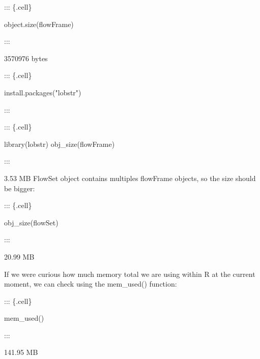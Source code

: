 \documentclass[
  letterpaper,
  DIV=11,
  numbers=noendperiod]{scrartcl}
\newenvironment{Shaded}{\begin{snugshade}}{\end{snugshade}}
\newcommand{\FunctionTok}[1]{\textcolor[rgb]{0.28,0.35,0.67}{#1}}
\newcommand{\NormalTok}[1]{\textcolor[rgb]{0.00,0.23,0.31}{#1}}
\newcommand{\StringTok}[1]{\textcolor[rgb]{0.13,0.47,0.30}{#1}}
\begin{document}
::: \{.cell\}

\begin{Shaded}
\begin{Highlighting}[]
\FunctionTok{object.size}\NormalTok{(flowFrame)}
\end{Highlighting}
\end{Shaded}

:::

3570976 bytes

::: \{.cell\}

\begin{Shaded}
\begin{Highlighting}[]
\FunctionTok{install.packages}\NormalTok{(}\StringTok{"lobstr"}\NormalTok{)}
\end{Highlighting}
\end{Shaded}

:::

::: \{.cell\}

\begin{Shaded}
\begin{Highlighting}[]
 \FunctionTok{library}\NormalTok{(lobstr)}
\FunctionTok{obj\_size}\NormalTok{(flowFrame) }
\end{Highlighting}
\end{Shaded}

:::

3.53 MB FlowSet object contains multiples flowFrame objects, so the size
should be bigger:

::: \{.cell\}

\begin{Shaded}
\begin{Highlighting}[]
\FunctionTok{obj\_size}\NormalTok{(flowSet)}
\end{Highlighting}
\end{Shaded}

:::

20.99 MB

If we were curious how much memory total we are using within R at the
current moment, we can check using the mem\_used() function:

::: \{.cell\}

\begin{Shaded}
\begin{Highlighting}[]
\FunctionTok{mem\_used}\NormalTok{()}
\end{Highlighting}
\end{Shaded}

:::

141.95 MB
\end{document}
